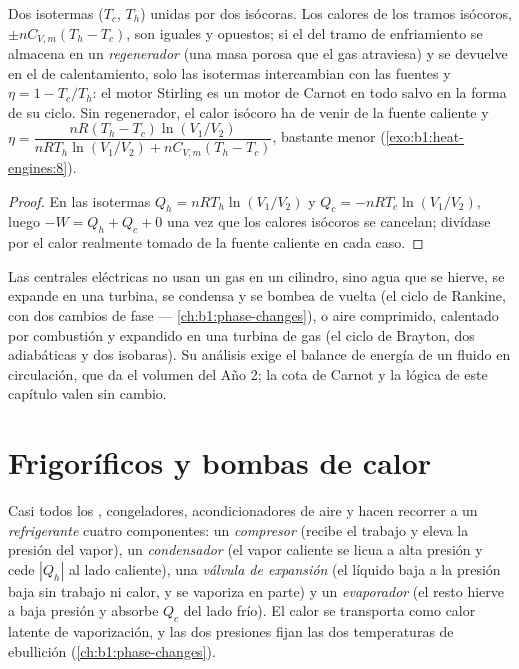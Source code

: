 \begin{proposition}\label{prop:b1:heat-engines:stirling}
Dos isotermas ($T_c$, $T_h$) unidas por dos isócoras. Los calores de los
tramos isócoros, $\pm nC_{V,m}(T_h - T_c)$, son iguales y opuestos; si el
del tramo de enfriamiento se almacena en un \emph{regenerador} (una masa
porosa que el gas atraviesa) y se devuelve en el de calentamiento, solo
las isotermas intercambian con las fuentes y $\eta = 1 - T_c/T_h$: el motor
Stirling es un motor de Carnot en todo salvo en la forma de su ciclo. Sin
regenerador, el calor isócoro ha de venir de la fuente caliente y
$\eta = \dfrac{nR(T_h - T_c)\ln(V_1/V_2)}{nRT_h\ln(V_1/V_2) + nC_{V,m}(T_h - T_c)}$,
bastante menor (\cref{exo:b1:heat-engines:8}).
\end{proposition}

\begin{proof}
En las isotermas $Q_h = nRT_h\ln(V_1/V_2)$ y $Q_c = -nRT_c\ln(V_1/V_2)$, luego
$-W = Q_h + Q_c + 0$ una vez que los calores isócoros se cancelan; divídase
por el calor realmente tomado de la fuente caliente en cada caso.
\end{proof}

\begin{remark}\label{rem:b1:heat-engines:turbines}
Las centrales eléctricas no usan un gas en un cilindro, sino agua que se
hierve, se expande en una turbina, se condensa y se bombea de vuelta (el
ciclo de Rankine, con dos cambios de fase --- \cref{ch:b1:phase-changes}),
o aire comprimido, calentado por combustión y expandido en una turbina de
gas (el ciclo de Brayton, dos adiabáticas y dos isobaras). Su análisis
exige el balance de energía de un fluido en circulación, que da el volumen
del Año 2; la cota de Carnot y la lógica de este capítulo valen sin cambio.
\end{remark}

\section{Frigoríficos y bombas de calor}

\begin{definition}\label{def:b1:heat-engines:vapourcycle}
Casi todos los , congeladores, acondicionadores de aire y
 hacen recorrer a un \emph{refrigerante} cuatro
componentes: un \emph{compresor} (recibe el trabajo y eleva la presión del
vapor), un \emph{condensador} (el vapor caliente se licua a alta presión y
cede $|Q_h|$ al lado caliente), una \emph{válvula de expansión} (el líquido
baja a la presión baja sin trabajo ni calor, y se vaporiza en parte) y un
\emph{evaporador} (el resto hierve a baja presión y absorbe $Q_c$ del lado
frío). El calor se transporta como calor latente de vaporización, y las
dos presiones fijan las dos temperaturas de ebullición
(\cref{ch:b1:phase-changes}).
\end{definition}

